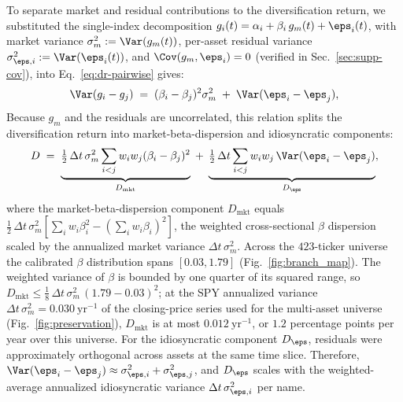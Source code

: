 To separate market and residual contributions to the diversification
return, we substituted the single-index decomposition
$g_i(t) = \alpha_i + \beta_i\, g_m(t) + \eps_i(t)$, with market
variance $\sigma_m^2 := \Var(g_m(t))$, per-asset residual variance
$\sigma_{\eps,i}^2 := \Var(\eps_i(t))$, and
$\Cov(g_m, \eps_i) = 0$ (verified in
Sec.~\ref{sec:supp-cov}), into Eq.~\eqref{eq:dr-pairwise} gives:
\begin{equation}
  \Var(g_i - g_j) \;=\; (\beta_i - \beta_j)^2 \sigma_m^2
  \;+\; \Var(\eps_i - \eps_j),
\end{equation}
Because $g_m$ and the residuals are uncorrelated, this relation splits
the diversification return into market-beta-dispersion and
idiosyncratic components:
\begin{equation}
  D \;=\;
  \underbrace{\tfrac{1}{2}\,\Delta t\,\sigma_m^2 \sum_{i<j} w_i w_j (\beta_i - \beta_j)^2}_{D_{\mathrm{mkt}}}
  \;+\;
  \underbrace{\tfrac{1}{2}\,\Delta t \sum_{i<j} w_i w_j \,\Var(\eps_i - \eps_j)}_{D_\eps},
  \label{eq:dr-sim}
\end{equation}
where the market-beta-dispersion component $D_\mathrm{mkt}$ equals
$\tfrac{1}{2}\,\Delta t\,\sigma_m^2 [\sum_i w_i \beta_i^2 -
(\sum_i w_i \beta_i)^2]$, the weighted cross-sectional $\beta$
dispersion scaled by the annualized market variance
$\Delta t\,\sigma_m^2$. Across the $423$-ticker universe the calibrated
$\beta$ distribution spans $[0.03, 1.79]$ (Fig.~\ref{fig:branch_map}).
The weighted variance of $\beta$ is bounded by one quarter of its
squared range, so $D_{\mathrm{mkt}} \le \tfrac{1}{8}\,\Delta t\,
\sigma_m^2\,(1.79 - 0.03)^2$; at the SPY annualized variance
$\Delta t\,\sigma_m^2 = 0.030~\mathrm{yr}^{-1}$ of the closing-price
series used for the multi-asset universe (Fig.~\ref{fig:preservation}),
$D_{\mathrm{mkt}}$ is at most $0.012~\mathrm{yr}^{-1}$, or $1.2$
percentage points per year over this universe. For the idiosyncratic
component $D_\eps$, residuals were approximately orthogonal across
assets at the same time slice. Therefore,
$\Var(\eps_i - \eps_j) \approx \sigma_{\eps,i}^2 + \sigma_{\eps,j}^2$,
and $D_\eps$ scales with the weighted-average annualized idiosyncratic
variance $\Delta t\,\sigma_{\eps,i}^2$ per name.

